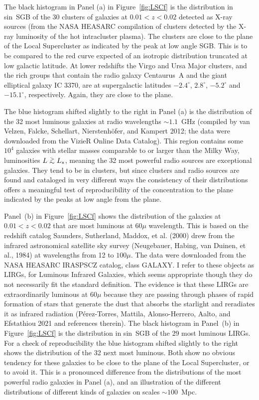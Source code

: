 \documentclass[fleqn,usenatbib]{mnras}
\def\gap{\lower.5ex\hbox{$\; \buildrel > \over \sim \;$}}
\begin{document}
The black histogram in Panel (a) in Figure~\ref{fig:LSCf}  is the distribution in sin~SGB of the 30 clusters of galaxies at $0.01 < z < 0.02$ detected as X-ray sources (from the NASA HEASARC compilation of clusters detected by the X-ray luminosity of the hot intracluster plasma). The clusters are close to the plane of the Local Supercluster as indicated by the peak at low angle SGB. This is to be compared to the red curve expected of an isotropic distribution truncated at low galactic latitude. At lower redshifts the Virgo and Ursa Major clusters, and the rich groups that contain the radio galaxy Centaurus~A and the giant elliptical galaxy IC 3370, are at supergalactic latitudes $-2.4^\circ$, $2.8^\circ$, $-5.2^\circ$ and $-15.1^\circ$, respectively. Again, they are close to the plane.

The blue histogram shifted slightly to the right in Panel (a) is the distribution of the 32 most luminous galaxies at radio wavelengths $\sim 1.1$~GHz (compiled by van Velzen, Falcke, Schellart, Nierstenh{\"o}fer, and Kampert 2012; the data were downloaded from the VizieR Online Data Catalog). This region contains some $10^4$ galaxies with stellar masses comparable to or larger than the Milky Way, luminosities $L\gap L_\ast$, meaning the 32 most powerful radio sources are exceptional galaxies. They tend to be in clusters, but since clusters and radio sources are found and cataloged in very different ways the consistency of their distributions offers a meaningful test of reproducibility of the concentration to the plane indicated by the peaks at low angle from the plane. 

Panel~(b) in Figure~\ref{fig:LSCf} shows the distribution of the galaxies at $0.01<z<0.02$ that are most luminous at $60\mu$ wavelength. This is based on the redshift catalog Saunders, Sutherland, Maddox, et al. (2000) drew from the infrared astronomical satellite sky survey (Neugebauer, Habing, van Duinen, et al., 1984) at wavelengths from 12 to $100\mu$. The data were downloaded from the NASA HEASARC IRASPSCZ catalog, class GALAXY.  I refer to these objects as LIRGs, for Luminous Infrared Galaxies, which seems appropriate though they do not necessarily fit the standard definition. The evidence is that these LIRGs are extraordinarily luminous at $60\mu$ because they are passing through phases of rapid formation of stars that generate the dust that absorbs the starlight and reradiates it as infrared radiation (P{\'e}rez-Torres, Mattila, Alonso-Herrero, Aalto, and Efstathiou 2021 and references therein). The black histogram  in Panel~(b) in Figure~\ref{fig:LSCf} is the distribution in sin~SGB of the 29 most luminous LIRGs. For a check of reproducibility the blue histogram shifted slightly to the right shows the distribution of the 32 next most luminous. Both show no obvious tendency for these galaxies to be close to the plane of the Local Supercluster, or to avoid it. This is a pronounced difference from the distributions of the most powerful radio galaxies in Panel (a), and an illustration of the different distributions of different kinds of galaxies on scales $\sim 100$~Mpc.
\end{document}
